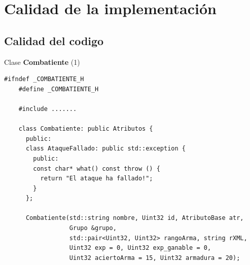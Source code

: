 \documentclass[9pt,xcolor=svgnames]{beamer}
\begin{document}
 \section{Calidad de la implementación}
 
  \subsection{Calidad del codigo}
  
  \begin{frame}[fragile=singleslide]{Clase \textbf{Combatiente} (1)}

   \begin{lstlisting}[style=C++]
    #ifndef _COMBATIENTE_H
    #define _COMBATIENTE_H

    #include .......

    class Combatiente: public Atributos {
      public:
      class AtaqueFallado: public std::exception {
        public:
        const char* what() const throw () {
          return "El ataque ha fallado!";
        }
      };

      Combatiente(std::string nombre, Uint32 id, AtributoBase atr,
                  Grupo &grupo,
                  std::pair<Uint32, Uint32> rangoArma, string rXML, 
                  Uint32 exp = 0, Uint32 exp_ganable = 0, 
                  Uint32 aciertoArma = 15, Uint32 armadura = 20);
      \end{lstlisting}
    
    \end{frame}
    
\end{document}
